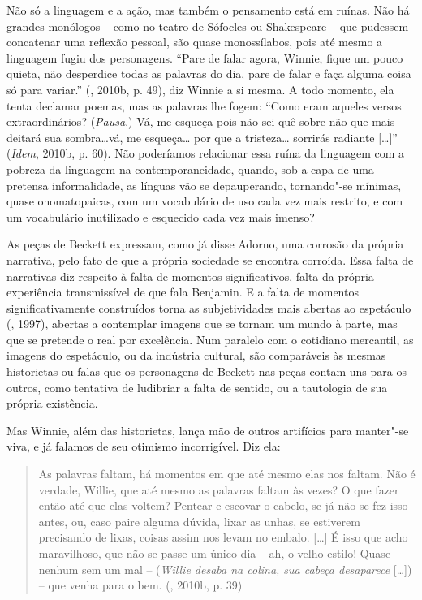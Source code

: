 Não só a linguagem e a ação, mas também o pensamento está em ruínas. Não
há grandes monólogos -- como no teatro de Sófocles ou Shakespeare -- que
pudessem concatenar uma reflexão pessoal, são quase monossílabos, pois
até mesmo a linguagem fugiu dos personagens. ``Pare de falar agora,
Winnie, fique um pouco quieta, não desperdice todas as palavras do dia,
pare de falar e faça alguma coisa só para variar.'' (, 2010b, p.
49), diz Winnie a si mesma. A todo momento, ela tenta declamar poemas,
mas as palavras lhe fogem: ``Como eram aqueles versos extraordinários?
(\emph{Pausa}.) Vá, me esqueça pois não sei quê sobre não que mais
deitará sua sombra\ldots{}vá, me esqueça\ldots{} por que a tristeza\ldots{} sorrirás
radiante [\ldots{}]'' (\emph{Idem}, 2010b, p. 60). Não poderíamos
relacionar essa ruína da linguagem com a pobreza da linguagem na
contemporaneidade, quando, sob a capa de uma pretensa informalidade, as
línguas vão se depauperando, tornando"-se mínimas, quase onomatopaicas,
com um vocabulário de uso cada vez mais restrito, e com um vocabulário
inutilizado e esquecido cada vez mais imenso?

As peças de Beckett expressam, como já disse Adorno, uma corrosão da
própria narrativa, pelo fato de que a própria sociedade se encontra
corroída. Essa falta de narrativas diz respeito à falta de momentos
significativos, falta da própria experiência transmissível de que fala
Benjamin. E a falta de momentos significativamente construídos torna as
subjetividades mais abertas ao espetáculo (, 1997), abertas a
contemplar imagens que se tornam um mundo à parte, mas que se pretende o
real por excelência. Num paralelo com o cotidiano mercantil, as imagens
do espetáculo, ou da indústria cultural, são comparáveis às mesmas
historietas ou falas que os personagens de Beckett nas peças contam uns
para os outros, como tentativa de ludibriar a falta de sentido, ou a
tautologia de sua própria existência.

Mas Winnie, além das historietas, lança mão de outros artifícios para
manter"-se viva, e já falamos de seu otimismo incorrigível. Diz ela:

\begin{quote}
As palavras faltam, há momentos em que até mesmo elas nos faltam. Não é
verdade, Willie, que até mesmo as palavras faltam às vezes? O que fazer
então até que elas voltem? Pentear e escovar o cabelo, se já não se fez
isso antes, ou, caso paire alguma dúvida, lixar as unhas, se estiverem
precisando de lixas, coisas assim nos levam no embalo. [\ldots{}] É
isso que acho maravilhoso, que não se passe um único dia -- ah, o velho
estilo! Quase nenhum sem um mal -- (\emph{Willie desaba na colina, sua
cabeça desaparece} [\ldots{}]) -- que venha para o bem. (,
2010b, p. 39)
\end{quote}

